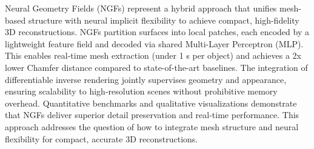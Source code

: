 Neural Geometry Fields (NGFs) represent a hybrid approach that unifies mesh-based structure with neural implicit flexibility to achieve compact, high-fidelity 3D reconstructions.  
NGFs partition surfaces into local patches, each encoded by a lightweight feature field and decoded via shared Multi-Layer Perceptron (MLP).  
This enables real-time mesh extraction (under 1 s per object) and achieves a 2x lower Chamfer distance compared to state-of-the-art baselines.  
The integration of differentiable inverse rendering jointly supervises geometry and appearance, ensuring scalability to high-resolution scenes without prohibitive memory overhead.  
Quantitative benchmarks and qualitative visualizations demonstrate that NGFs deliver superior detail preservation and real-time performance.  
This approach addresses the question of how to integrate mesh structure and neural flexibility for compact, accurate 3D reconstructions.  
